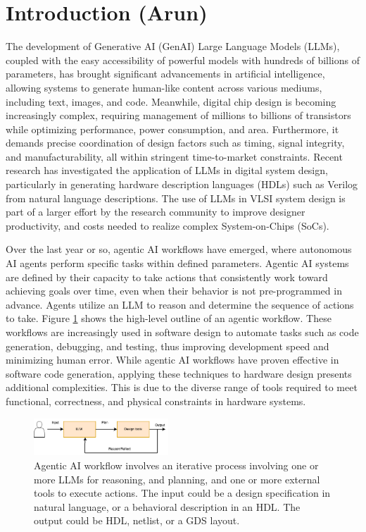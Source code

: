 \section{Introduction (Arun)}
\label{sec:introduction}

The development of Generative AI (GenAI) Large Language Models (LLMs), coupled with the easy accessibility of powerful models with hundreds of billions of parameters,  has brought significant advancements in artificial intelligence, allowing systems to generate human-like content across various mediums, including text, images, and code. Meanwhile, digital chip design is becoming increasingly complex, requiring management of millions to billions of transistors while optimizing performance, power consumption, and area. Furthermore, it demands precise coordination of design factors such as timing, signal integrity, and manufacturability, all within stringent time-to-market constraints. Recent research has investigated the application of LLMs in digital system design, particularly in generating hardware description languages (HDLs) such as Verilog from natural language descriptions. The use of LLMs in VLSI system design is part of a larger effort by the research community to improve designer productivity, and costs needed to realize complex System-on-Chips (SoCs).

Over the last year or so, agentic AI workflows have emerged, where autonomous AI agents perform specific tasks within defined parameters. Agentic AI systems are defined by their capacity to take actions that consistently work toward achieving goals over time, even when their behavior is not pre-programmed in advance. Agents utilize an LLM to reason and determine the sequence of actions to take. Figure \ref{fig:agenttic_overview} shows the high-level outline of an agentic workflow.  These workflows are increasingly used in software design to automate tasks such as code generation, debugging, and testing, thus improving development speed and minimizing human error. While agentic AI workflows have proven effective in software code generation, applying these techniques to hardware design presents additional complexities. This is due to the diverse range of tools required to meet functional, correctness, and physical constraints in hardware systems.


\begin{figure}[htbp]
	\includegraphics[width=0.45\textwidth]{figs/agentic_overview.png}
	\caption{Agentic AI workflow involves an iterative process involving one or more LLMs for reasoning, and planning, and one or more external tools to execute actions. The input could be a design specification in natural language, or a behavioral description in an HDL. The output could be HDL, netlist, or a GDS layout.
}
	\label{fig:agenttic_overview}
\end{figure}

